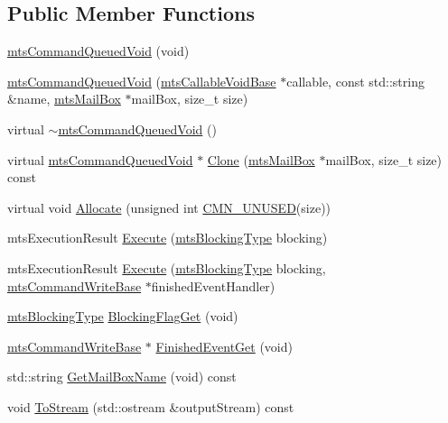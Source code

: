 \subsection*{Public Member Functions}
\begin{DoxyCompactItemize}
\item 
\hyperlink{classmts_command_queued_void_ae4b533b50c449cae2635e9a03f311e48}{mts\+Command\+Queued\+Void} (void)
\item 
\hyperlink{classmts_command_queued_void_affae2e472d01c8042d73af7e8b625f09}{mts\+Command\+Queued\+Void} (\hyperlink{classmts_callable_void_base}{mts\+Callable\+Void\+Base} $\ast$callable, const std\+::string \&name, \hyperlink{classmts_mail_box}{mts\+Mail\+Box} $\ast$mail\+Box, size\+\_\+t size)
\item 
virtual \hyperlink{classmts_command_queued_void_ae7df3dadda5dfe5f8451df3f876e2bed}{$\sim$mts\+Command\+Queued\+Void} ()
\item 
virtual \hyperlink{classmts_command_queued_void}{mts\+Command\+Queued\+Void} $\ast$ \hyperlink{classmts_command_queued_void_ac05543187c0ece13fee129e78a3db5c3}{Clone} (\hyperlink{classmts_mail_box}{mts\+Mail\+Box} $\ast$mail\+Box, size\+\_\+t size) const 
\item 
virtual void \hyperlink{classmts_command_queued_void_a78454afe56333b6e5bb2e9c07510bc67}{Allocate} (unsigned int \hyperlink{cmn_portability_8h_a021894e2626935fa2305434b1e893ff6}{C\+M\+N\+\_\+\+U\+N\+U\+S\+E\+D}(size))
\item 
mts\+Execution\+Result \hyperlink{classmts_command_queued_void_ac3d3b8518799820922ccfa207ecd7ab1}{Execute} (\hyperlink{mts_forward_declarations_8h_ad7426ccb6c883bc780d0ee197dddcbe7}{mts\+Blocking\+Type} blocking)
\item 
mts\+Execution\+Result \hyperlink{classmts_command_queued_void_a116aafff54b04cf64c0cc5613b3af268}{Execute} (\hyperlink{mts_forward_declarations_8h_ad7426ccb6c883bc780d0ee197dddcbe7}{mts\+Blocking\+Type} blocking, \hyperlink{classmts_command_write_base}{mts\+Command\+Write\+Base} $\ast$finished\+Event\+Handler)
\item 
\hyperlink{mts_forward_declarations_8h_ad7426ccb6c883bc780d0ee197dddcbe7}{mts\+Blocking\+Type} \hyperlink{classmts_command_queued_void_a163d660aee89584416b7d30fb171a388}{Blocking\+Flag\+Get} (void)
\item 
\hyperlink{classmts_command_write_base}{mts\+Command\+Write\+Base} $\ast$ \hyperlink{classmts_command_queued_void_ae1854cdc3b5616be70f882958a0d05de}{Finished\+Event\+Get} (void)
\item 
std\+::string \hyperlink{classmts_command_queued_void_af4cee03f759bbaece836a573fb1772c2}{Get\+Mail\+Box\+Name} (void) const 
\item 
void \hyperlink{classmts_command_queued_void_ab5d265a6803f5d3c6d540bf3c4c2fd36}{To\+Stream} (std\+::ostream \&output\+Stream) const 
\end{DoxyCompactItemize}
